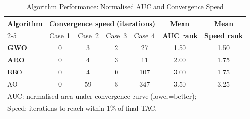 \begin{table}[!t]
\caption{Algorithm Performance: Normalised AUC and Convergence Speed}
\label{tab:algoperf}
\centering
\begin{tabular}{lcccccc}
\toprule
\textbf{Algorithm} & \multicolumn{4}{c}{\textbf{Convergence speed (iterations)}} & \textbf{Mean} & \textbf{Mean} \\
\cmidrule(lr){2-5}
 & Case~1 & Case~2 & Case~3 & Case~4 & \textbf{AUC rank} & \textbf{Speed rank} \\
\midrule
\textbf{GWO} & 0 & 3 & 2 & 27 & 1.50 & 1.50 \\
\textbf{ARO} & 0 & 4 & 3 & 11 & 2.00 & 1.75 \\
BBO & 0 & 4 & 0 & 107 & 3.00 & 1.75 \\
AO & 0 & 59 & 8 & 347 & 3.50 & 3.25 \\
\bottomrule
\multicolumn{7}{l}{\footnotesize AUC: normalised area under convergence curve (lower=better);}\\
\multicolumn{7}{l}{\footnotesize Speed: iterations to reach within 1\% of final TAC.}\\
\end{tabular}
\end{table}